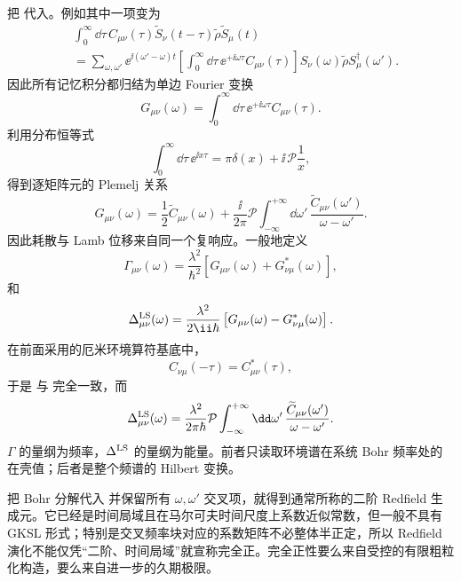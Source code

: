 把 代入。例如其中一项变为
\[
\begin{aligned}
&\int_0^\infty\dd\tau\,
C_{\mu\nu}(\tau)
\widetilde S_\nu(t-\tau)\widetilde\rho\widetilde S_\mu(t)\\
&=\sum_{\omega,\omega'}
\ee^{\ii(\omega'-\omega)t}
\left[
\int_0^\infty\dd\tau\,
\ee^{+\ii\omega\tau}C_{\mu\nu}(\tau)
\right]
S_\nu(\omega)\widetilde\rho S_\mu^\dagger(\omega').
\end{aligned}
\]
因此所有记忆积分都归结为单边 Fourier 变换
\begin{equation}
G_{\mu\nu}(\omega)
=\int_0^\infty\dd\tau\,
\ee^{+\ii\omega\tau}C_{\mu\nu}(\tau).
\label{eq:phys-oqs-one-sided-response}
\end{equation}
利用分布恒等式
\[
\int_0^\infty\dd\tau\,\ee^{\ii x\tau}
=\pi\delta(x)+\ii\,\mathcal P\frac1x,
\]
得到逐矩阵元的 Plemelj 关系
\begin{equation}
G_{\mu\nu}(\omega)
=\frac12\widetilde C_{\mu\nu}(\omega)
+\frac{\ii}{2\pi}\mathcal P
\int_{-\infty}^{+\infty}\dd\omega'\,
\frac{\widetilde C_{\mu\nu}(\omega')}{\omega-\omega'}.
\label{eq:phys-oqs-plemelj}
\end{equation}
因此耗散与 Lamb 位移来自同一个复响应。一般地定义
\begin{equation}
\Gamma_{\mu\nu}(\omega)
=\frac{\lambda^2}{\hbar^2}
\left[G_{\mu\nu}(\omega)+G_{\nu\mu}^*(\omega)\right],
\label{eq:phys-oqs-gamma-from-g}
\end{equation}
和
\begin{equation}
\Delta_{\mu\nu}^{\rm LS}(\omega)
=\frac{\lambda^2}{2\ii\hbar}
\left[G_{\mu\nu}(\omega)-G_{\nu\mu}^*(\omega)\right].
\label{eq:phys-oqs-delta-ls}
\end{equation}
在前面采用的厄米环境算符基底中，
\[
C_{\nu\mu}(-\tau)=C_{\mu\nu}^*(\tau),
\]
于是 与 完全一致，而
\begin{equation}
\Delta_{\mu\nu}^{\rm LS}(\omega)
=\frac{\lambda^2}{2\pi\hbar}
\mathcal P\int_{-\infty}^{+\infty}\dd\omega'\,
\frac{\widetilde C_{\mu\nu}(\omega')}{\omega-\omega'}.
\label{eq:phys-oqs-delta-hilbert}
\end{equation}
$\Gamma$ 的量纲为频率，$\Delta^{\rm LS}$ 的量纲为能量。前者只读取环境谱在系统 Bohr 频率处的在壳值；后者是整个频谱的 Hilbert 变换。

把 Bohr 分解代入 并保留所有 $\omega,\omega'$ 交叉项，就得到通常所称的二阶 Redfield 生成元。它已经是时间局域且在马尔可夫时间尺度上系数近似常数，但一般不具有 GKSL 形式；特别是交叉频率块对应的系数矩阵不必整体半正定，所以 Redfield 演化不能仅凭“二阶、时间局域”就宣称完全正。完全正性要么来自受控的有限粗粒化构造，要么来自进一步的久期极限。

